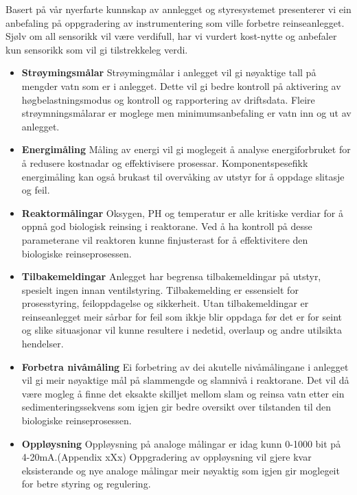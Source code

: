 Basert på vår nyerfarte kunnskap av annlegget og styresystemet presenterer vi ein
anbefaling på oppgradering av instrumentering som ville forbetre reinseanlegget. 
Sjølv om all sensorikk vil være verdifull, har vi vurdert kost-nytte og anbefaler kun sensorikk som vil gi tilstrekkeleg verdi.

\begin{itemize}
    \item \textbf{Strøymingsmålar} \newline
        Strøymingmålar i anlegget vil gi nøyaktige tall på mengder vatn som er i anlegget.
        Dette vil gi bedre kontroll på aktivering av høgbelastningsmodus og kontroll og rapportering av driftsdata.
        Fleire strøymningsmålarar er moglege men minimumsanbefaling er vatn inn og ut av anlegget.
    \item \textbf{Energimåling} \newline
        Måling av energi vil gi moglegeit å analyse energiforbruket for å redusere kostnadar og effektivisere prosessar.
        Komponentspesefikk energimåling kan også brukast til overvåking av utstyr for å oppdage slitasje og feil.
    \item \textbf{Reaktormålingar} \newline
        Oksygen, PH og temperatur er alle kritiske verdiar for å oppnå god biologisk reinsing i reaktorane. \newline
        Ved å ha kontroll på desse parameterane vil reaktoren kunne finjusterast for å effektivitere den biologiske reinseprosessen.
    \item \textbf{Tilbakemeldingar} \newline
        Anlegget har begrensa tilbakemeldingar på utstyr, spesielt ingen innan ventilstyring.
        Tilbakemelding er essensielt for prosesstyring, feiloppdagelse og sikkerheit.
        Utan tilbakemeldingar er reinseanlegget meir sårbar for feil som ikkje blir oppdaga før det er for seint 
        og slike situasjonar vil kunne resultere i nedetid, overlaup og andre utilsikta hendelser.
    \item \textbf{Forbetra nivåmåling} \newline
        Ei forbetring av dei akutelle nivåmålingane i anlegget vil gi meir nøyaktige mål på slammengde og slamnivå i reaktorane.
        Det vil då være mogleg å finne det eksakte skilljet mellom slam og reinsa vatn etter ein sedimenteringssekvens som igjen
        gir bedre oversikt over tilstanden til den biologiske reinseprosessen.
    \item \textbf{Oppløysning} \newline
        Oppløysning på analoge målingar er idag kunn 0-1000 bit på 4-20mA.(Appendix xXx) \newline
        Oppgradering av oppløysning vil gjere kvar eksisterande og nye analoge målingar
        meir nøyaktig som igjen gir moglegeit for betre styring og regulering.
\end{itemize}
\newpage

